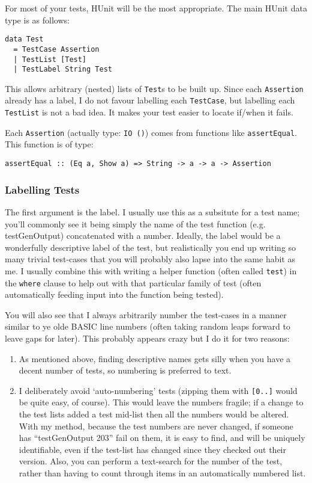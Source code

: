 \documentclass[a4wide]{article}
\begin{document}
For most of	your tests, HUnit will be the most appropriate.  The main HUnit data type is as follows:

\begin{lstlisting}
data Test
  = TestCase Assertion
  | TestList [Test]
  | TestLabel String Test
\end{lstlisting}

This allows arbitrary (nested) lists of \lstinline|Test|s to be built up.  Since each \lstinline|Assertion|
already has a label, I do not favour labelling each \lstinline|TestCase|, but labelling each \lstinline|TestList|
is not a bad idea.  It makes your test easier to locate if/when it fails.

Each \lstinline|Assertion| (actually type: \lstinline|IO ()|) comes from functions like 
\lstinline|assertEqual|.  This function is of type:

\begin{lstlisting}
assertEqual :: (Eq a, Show a) => String -> a -> a -> Assertion
\end{lstlisting}

\subsubsection{Labelling Tests}

The first argument is the label.  I usually use this as a subsitute for a test name; you'll commonly see
it being simply the name of the test function (e.g. testGenOutput) concatenated with a number.  Ideally,
the label would be a wonderfully descriptive label of the test, but realistically you end up writing so
many trivial test-cases that you will probably also lapse into the same habit as me.  I usually combine
this with writing a helper function (often called \lstinline|test|) in the \lstinline|where| clause
to help out with that particular family of test (often automatically feeding input into the function
being tested).

You will also see that I always arbitrarily number the test-cases in a manner similar to ye olde BASIC
line numbers (often taking random leaps forward to leave gaps for later).  This probably appears crazy
but I do it for two reasons:

\begin{enumerate}
\item As mentioned above, finding descriptive names gets silly when you have a decent number of tests,
so numbering is preferred to text.
\item I deliberately avoid `auto-numbering' tests (zipping them with \lstinline|[0..]| would be quite
easy, of course).  This would leave the numbers fragile; if a change to the test lists added a test
mid-list then all the numbers would be altered.  With my method, because the test numbers are never
changed, if someone has ``testGenOutput 203'' fail on them, it is easy to find, and will be uniquely
identifiable, even if the test-list has changed since they checked out their version.  Also, you
can perform a text-search for the number of the test, rather than having to count through items
in an automatically numbered list.
\end{enumerate}
\end{document}
